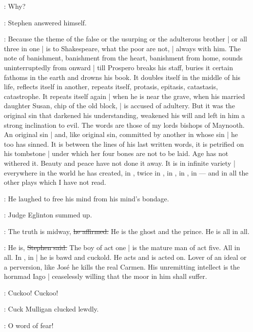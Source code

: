 \Stephen:
Why?

:
Stephen answered himself.

\Stephen:
Because the theme of the false
or the usurping
or the adulterous brother |
or all three in one |
is to Shakespeare,
what the poor are not, |
always with him.
The note of banishment,
banishment from the heart,
banishment from home,
sounds uninterruptedly from  onward |
till Prospero breaks his staff,
buries it certain fathoms in the earth and drowns his book.
It doubles itself in the middle of his life,
reflects itself in another,
repeats itself,
protasis,
epitasis,
catastasis,
catastrophe.
It repeats itself again |
when he is near the grave,
when his married daughter Susan,
chip of the old block, |
is accused of adultery.
But it was the original sin that darkened his understanding,
weakened his will and left in him a strong inclination to evil.
The words are those of my lords bishops of Maynooth.
An original sin |
and, like original sin,
committed by another in whose sin |
he too has sinned.
It is between the lines of his last written words,
it is petrified on his tombstone |
under which her four bones are not to be laid.
Age has not withered it.
Beauty and peace have not done it away.
It is in infinite variety |
everywhere in the world he has created,
in ,
twice in ,
in ,
in ,
in  ---
and in all the other plays which I have not read.

:
He laughed to free his mind from his mind's bondage.


:
Judge Eglinton summed up.

\eglinton:
The truth is midway,
\sout{he affirmed.}
He is the ghost and the prince.
He is all in all.

\Stephen:
He is,
\sout{Stephen said.}
The boy of act one |
is the mature man of act five.
All in all.
In ,
in  |
he is bawd and cuckold.
He acts and is acted on.
Lover of an ideal or a perversion,
like José
he kills the real Carmen.
His unremitting intellect is the hornmad Iago |
ceaselessly willing that the moor in him shall suffer.

\mulligan:
Cuckoo! Cuckoo!

:
Cuck Mulligan clucked lewdly.

\mulligan:
O word of fear!

